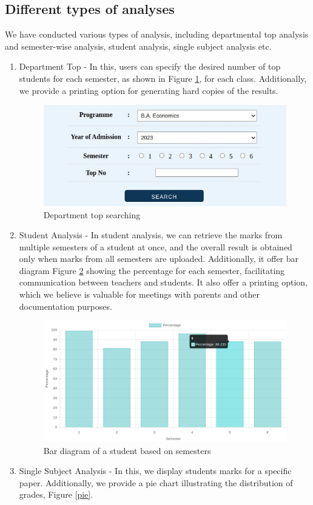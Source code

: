 \documentclass{nascproject}
\begin{document}
\subsection{Different types of analyses}
We have conducted various types of analysis, including departmental top analysis and semester-wise analysis, student analysis, single subject analysis etc.
\begin{enumerate}
	\item Department Top - In this, users can specify the desired number of top students for each semester, as shown in Figure \ref{dept_top}, for each class. Additionally, we provide a printing option for generating hard copies of the results.

 \begin{figure}[H]
	\centering
	\includegraphics[scale=0.5]{top.jpeg}
	\caption{Department top searching}
	\label{dept_top}
\end{figure}

	\item Student Analysis - In student analysis, we can retrieve the marks from multiple semesters of a student at once, and the overall result is obtained only when marks from all semesters are uploaded. Additionally, it offer bar diagram Figure \ref{graph} showing the percentage for each semester, facilitating communication between teachers and students. It also offer a printing option, which we believe is valuable for meetings with parents and other documentation purposes.

 \begin{figure}[H]
	\centering
	\includegraphics[scale=0.35]{bar_diagram.png}
	\caption{Bar diagram of a student based on semesters}
	\label{graph}
\end{figure}
	\item Single Subject Analysis - In this, we display students marks for a specific paper. Additionally, we provide a pie chart illustrating the distribution of grades, Figure \ref{pie}.


\end{enumerate}
\end{document}
